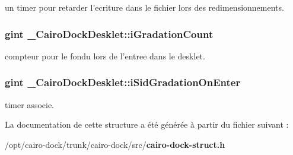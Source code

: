 un timer pour retarder l'ecriture dans le fichier lors des redimensionnements. 

\subsubsection{\setlength{\rightskip}{0pt plus 5cm}gint {\bf \_\-CairoDockDesklet::iGradationCount}}\label{struct__CairoDockDesklet_c40bff8a72e0791ae473bf405322f004}


compteur pour le fondu lors de l'entree dans le desklet. 

\subsubsection{\setlength{\rightskip}{0pt plus 5cm}gint {\bf \_\-CairoDockDesklet::iSidGradationOnEnter}}\label{struct__CairoDockDesklet_04e832c832d8da7b479d250b08a4cbba}


timer associe. 



La documentation de cette structure a été générée à partir du fichier suivant :\begin{CompactItemize}
\item 
/opt/cairo-dock/trunk/cairo-dock/src/{\bf cairo-dock-struct.h}\end{CompactItemize}
